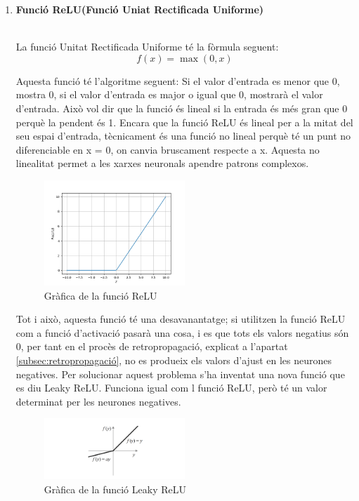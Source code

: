 \begin{enumerate}
\item \hypertarget{subsec:1}{\textbf{Funció ReLU(Funció Uniat Rectificada Uniforme)}}\\

La funció Unitat Rectificada Uniforme té la fòrmula seguent:
\[ f(x) = \max(0, x) \]

Aquesta funció té l'algoritme seguent: Si el valor d'entrada es menor que 0, mostra 0, si el valor d'entrada es major o igual que 0, mostrarà el valor d'entrada. Això vol dir que la funció és lineal si la entrada és més gran que 0 perquè la pendent és 1. Encara que la funció ReLU és lineal per a la mitat del seu espai d'entrada, tècnicament és una funció no lineal perquè té un punt no diferenciable en x = 0, on canvia bruscament respecte a x. Aquesta no linealitat permet a les xarxes neuronals apendre patrons complexos.

\begin{figure}[h!]
    \centering
    \includegraphics[width=0.5\textwidth]{./figures/ReLU.png}
    \caption{Gràfica de la funció ReLU}
\end{figure}

Tot i això, aquesta funció té una desavanantatge; si utilitzen la funció ReLU com a funció d'activació pasarà una cosa, i es que tots els valors negatius són 0, per tant en el procès de retropropagació, explicat a l'apartat \ref{subsec:retropropagació}, no es produeix els valors d'ajust en les neurones negatives. Per solucionar aquest problema s'ha inventat una nova funció que es diu Leaky ReLU. Funciona igual com l funció ReLU, però té un valor determinat per les neurones negatives.

\begin{figure}[h!]
    \centering
    \includegraphics[width=0.5\textwidth]{./figures/leaky_ReLU.png}
    \caption{Gràfica de la funció Leaky ReLU}
\end{figure}


\end{enumerate}
